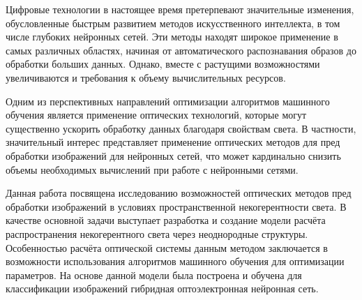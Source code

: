 Цифровые технологии в настоящее время претерпевают значительные изменения, обусловленные быстрым развитием методов искусственного интеллекта, в том числе глубоких нейронных сетей. Эти методы находят широкое применение в самых различных областях, начиная от автоматического распознавания образов до обработки больших данных. Однако, вместе с растущими возможностями увеличиваются и требования к объему вычислительных ресурсов.
\par
Одним из перспективных направлений оптимизации алгоритмов машинного обучения является применение оптических технологий, которые могут существенно ускорить обработку данных благодаря свойствам света. В частности, значительный интерес представляет применение оптических методов для пред обработки изображений для нейронных сетей, что может кардинально снизить объемы необходимых вычислений при работе с нейронными сетями.
\par
Данная работа посвящена исследованию возможностей оптических методов пред обработки изображений в условиях пространственной некогерентности света. В качестве основной задачи выступает разработка и создание модели расчёта распространения некогерентного света через неоднородные структуры. Особенностью расчёта оптической системы данным методом заключается в возможности использования алгоритмов машинного обучения для оптимизации параметров. На основе данной модели была построена и обучена для классификации изображений гибридная оптоэлектронная нейронная сеть.